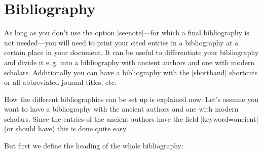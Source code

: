 \documentclass[a4paper,
10pt,
greek,
french,
spanish,
italian,
ngerman,
english
]{ltxdoc}
\begin{document}
  


 \section{Bibliography}\label{bibliographie}
 \DescribeMacro{\printbibliography}
As long as you don’t use the option |seenote|---for 
which a final bibliography is not needed---you will need to print your cited entries in a bibliography 
at a certain place in your document.
It can be useful to differentiate your bibliography and divide it e.\,g. into a bibliography 
with ancient authors and one with modern scholars.
Additionally you can have a bibliography with the |shorthand| shortcuts or all abbreviated journal titles, etc.

How the different bibliographies can be set up is explained now:
Let’s assume you want to have a bibliography with the ancient authors and one with modern scholars.
Since the entries of the ancient authors have the field |keyword={ancient}| (or should have) this is done quite easy.

But first we define the heading of the whole  bibliography:
\end{document}
